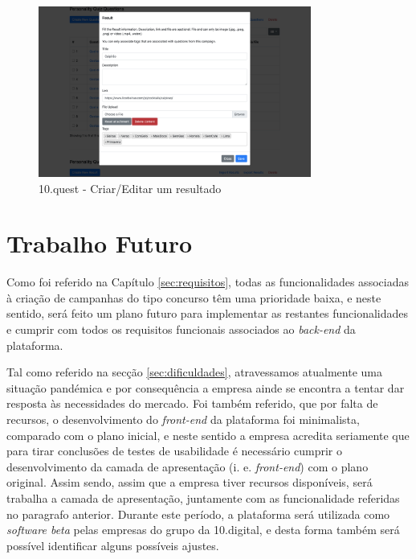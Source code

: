 \begin{figure}[ht!]
	\begin{center}
		\includegraphics[width=0.8\textwidth]{img/product/pq_result}
		\caption{10.quest - Criar/Editar um resultado}
		\label{fig:pq_result}
	\end{center}
\end{figure}



\section{Trabalho Futuro}

Como foi referido na Capítulo \ref{sec:requisitos}, todas as funcionalidades associadas à criação de campanhas do tipo concurso têm uma prioridade baixa, e neste sentido, será feito um plano futuro para implementar as restantes funcionalidades e cumprir com todos os requisitos funcionais associados ao \textit{back-end} da plataforma.

Tal como referido na secção \ref{sec:dificuldades}, atravessamos atualmente uma situação pandémica e por consequência a empresa ainde se encontra a tentar dar resposta às necessidades do mercado. Foi também referido, que por falta de recursos, o desenvolvimento do \textit{front-end} da plataforma foi minimalista, comparado com o plano inicial, e neste sentido a empresa acredita seriamente que para tirar conclusões de testes de usabilidade é necessário cumprir o desenvolvimento da camada de apresentação (i. e. \textit{front-end}) com o plano original. Assim sendo, assim que a empresa tiver recursos disponíveis, será trabalha a camada de apresentação, juntamente com as funcionalidade referidas no paragrafo anterior.
Durante este período, a plataforma será utilizada como \textit{software beta} pelas empresas do grupo da 10.digital, e desta forma também será possível identificar alguns possíveis ajustes.



\blankpage

\glsresetall
